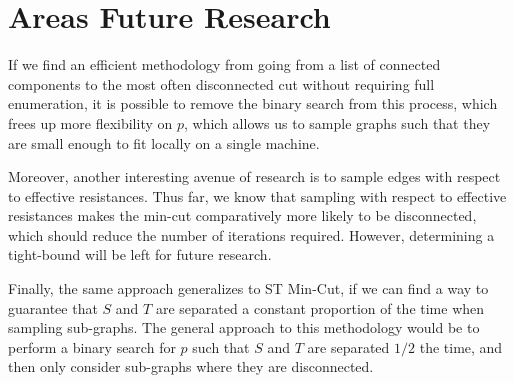 \documentclass[12pt]{article}
\begin{document}
\section{Areas Future Research}

If we find an efficient methodology from going from a list of connected components to the most often disconnected cut without requiring full enumeration, it is possible to remove the binary search from this process, which frees up more flexibility on $p$, which allows us to sample graphs such that they are small enough to fit locally on a single machine.

Moreover, another interesting avenue of research is to sample edges with respect to effective resistances. Thus far, we know that sampling with respect to effective resistances makes the min-cut comparatively more likely to be disconnected, which should reduce the number of iterations required. However, determining a tight-bound will be left for future research.

Finally, the same approach generalizes to ST Min-Cut, if we can find a way to guarantee that $S$ and $T$ are separated a constant proportion of the time when sampling sub-graphs. The general approach to this methodology would be to perform a binary search for $p$ such that $S$ and $T$ are separated $1/2$ the time, and then only consider sub-graphs where they are disconnected.
\end{document}
